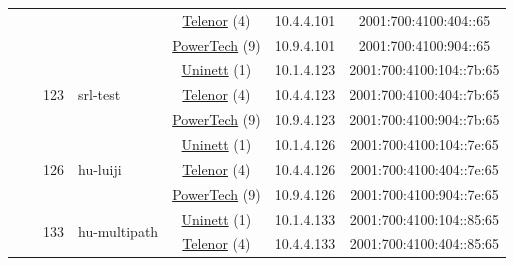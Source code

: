 \begin{small}
\begin{center}
\begin{longtable}{|c|c|c|c|c|c|c|c|}
  &  & \multicolumn{2}{|c|}{} & \multicolumn{2}{|c|}{\tiny{\href{https://www.telenor.no}{Telenor} (4)}} & \tiny{10.4.4.101} & \tiny{2001:700:4100:404::65} \\* \cline{5-5}\cline{6-6}\cline{7-7}\cline{8-8}
  &  & \multicolumn{2}{|c|}{} & \multicolumn{2}{|c|}{\tiny{\href{http://www.powertech.no}{PowerTech} (9)}} & \tiny{10.9.4.101} & \tiny{2001:700:4100:904::65} \\* \cline{3-3}\cline{4-4}\cline{5-5}\cline{6-6}\cline{7-7}\cline{8-8}
  &  & \multirow{3}{*}{\tiny{123}} & \multicolumn{1}{|l|}{\multirow{3}{*}{\tiny{srl-test}}} & \multicolumn{2}{|c|}{\tiny{\href{https://www.uninett.no}{Uninett} (1)}} & \tiny{10.1.4.123} & \tiny{2001:700:4100:104::7b:65} \\* \cline{5-5}\cline{6-6}\cline{7-7}\cline{8-8}
  &  &  &  & \multicolumn{2}{|c|}{\tiny{\href{https://www.telenor.no}{Telenor} (4)}} & \tiny{10.4.4.123} & \tiny{2001:700:4100:404::7b:65} \\* \cline{5-5}\cline{6-6}\cline{7-7}\cline{8-8}
  &  &  &  & \multicolumn{2}{|c|}{\tiny{\href{http://www.powertech.no}{PowerTech} (9)}} & \tiny{10.9.4.123} & \tiny{2001:700:4100:904::7b:65} \\* \cline{3-3}\cline{4-4}\cline{5-5}\cline{6-6}\cline{7-7}\cline{8-8}
  &  & \multirow{3}{*}{\tiny{126}} & \multicolumn{1}{|l|}{\multirow{3}{*}{\tiny{hu-luiji}}} & \multicolumn{2}{|c|}{\tiny{\href{https://www.uninett.no}{Uninett} (1)}} & \tiny{10.1.4.126} & \tiny{2001:700:4100:104::7e:65} \\* \cline{5-5}\cline{6-6}\cline{7-7}\cline{8-8}
  &  &  &  & \multicolumn{2}{|c|}{\tiny{\href{https://www.telenor.no}{Telenor} (4)}} & \tiny{10.4.4.126} & \tiny{2001:700:4100:404::7e:65} \\* \cline{5-5}\cline{6-6}\cline{7-7}\cline{8-8}
  &  &  &  & \multicolumn{2}{|c|}{\tiny{\href{http://www.powertech.no}{PowerTech} (9)}} & \tiny{10.9.4.126} & \tiny{2001:700:4100:904::7e:65} \\* \cline{3-3}\cline{4-4}\cline{5-5}\cline{6-6}\cline{7-7}\cline{8-8}
  &  & \multirow{3}{*}{\tiny{133}} & \multicolumn{1}{|l|}{\multirow{3}{*}{\tiny{hu-multipath}}} & \multicolumn{2}{|c|}{\tiny{\href{https://www.uninett.no}{Uninett} (1)}} & \tiny{10.1.4.133} & \tiny{2001:700:4100:104::85:65} \\* \cline{5-5}\cline{6-6}\cline{7-7}\cline{8-8}
  &  &  &  & \multicolumn{2}{|c|}{\tiny{\href{https://www.telenor.no}{Telenor} (4)}} & \tiny{10.4.4.133} & \tiny{2001:700:4100:404::85:65} \\* \cline{5-5}\cline{6-6}\cline{7-7}\cline{8-8}

\end{longtable}
\end{center}
\end{small}
